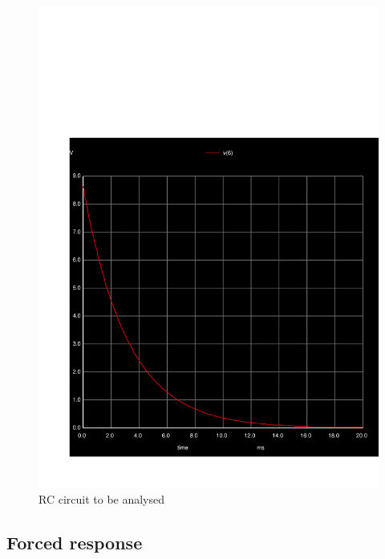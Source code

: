   \begin{figure}[H] \centering
    \includegraphics[width=1\linewidth]{../sim/trans3.pdf}
    \caption{RC circuit to be analysed}
    \label{fig:t2}
    \end{figure}

  \subsection{Forced response}


